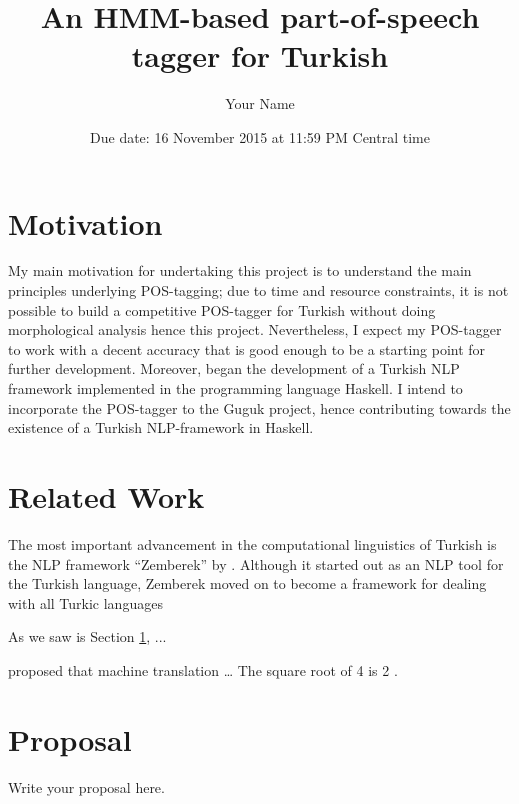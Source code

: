 \documentclass{article}
\title{\bf An HMM-based part-of-speech tagger for Turkish}
\author{Your Name}
\date{Due date: 16 November 2015 at 11:59 PM Central time}
\begin{document}
\maketitle

\section{Motivation}
\label{sec:motivation}
My main motivation for undertaking this project is to understand the main
principles underlying POS-tagging; due to time and resource constraints, it is
not possible to build a competitive POS-tagger for Turkish without doing
morphological analysis hence this project. Nevertheless, I expect my POS-tagger
to work with a decent accuracy that is good enough to be a starting point for
further development. Moreover, \citet{Korkut2015} began the development of a
Turkish NLP framework implemented in the programming language Haskell. I intend to incorporate the
POS-tagger to the Guguk project, hence contributing towards the existence of a
Turkish NLP-framework in Haskell.

\section{Related Work}

The most important advancement in the computational linguistics of Turkish is
the NLP framework ``Zemberek'' by \citet{akin2007zemberek}. Although it started
out as an NLP tool for the Turkish language, Zemberek moved on to become a
framework for dealing with all Turkic languages

As we saw is Section \ref{sec:motivation}, ...
%
%

\citet{Weaver_memo_1949} proposed that machine translation \ldots
%
The square root of 4 is 2 \citep{1952_06_17_BarHillel}.


\section{Proposal}

Write your proposal here.




\end{document}
